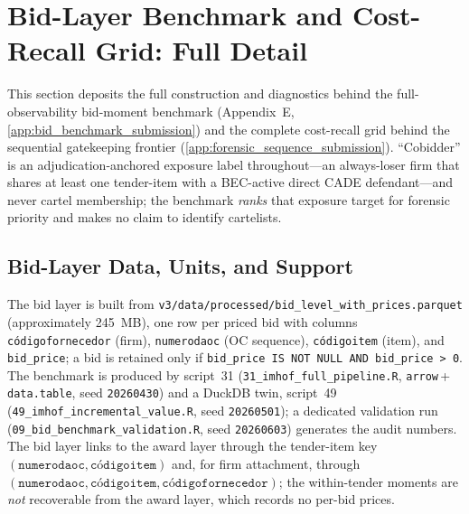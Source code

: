 \section{Bid-Layer Benchmark and Cost-Recall Grid: Full Detail}
\label{supp:bid_cost}

This section deposits the full construction and diagnostics behind the
full-observability bid-moment benchmark (Appendix~E,
\ref{app:bid_benchmark_submission}) and the complete cost-recall grid behind
the sequential gatekeeping frontier (\ref{app:forensic_sequence_submission}).
``Cobidder'' is an adjudication-anchored exposure label throughout---an
always-loser firm that shares at least one tender-item with a BEC-active
direct CADE defendant---and never cartel membership; the benchmark
\emph{ranks} that exposure target for forensic priority and makes no claim to
identify cartelists.

\subsection{Bid-Layer Data, Units, and Support}
\label{supp:bid_data}

The bid layer is built from
\texttt{v3/data/processed/bid\_level\_with\_prices.parquet}
(approximately 245~MB), one row per priced bid with columns
\texttt{c\'odigofornecedor} (firm), \texttt{numerodaoc} (OC sequence),
\texttt{c\'odigoitem} (item), and \texttt{bid\_price}; a bid is retained
only if \texttt{bid\_price IS NOT NULL AND bid\_price > 0}. The benchmark
is produced by script~31 (\texttt{31\_imhof\_full\_pipeline.R},
\texttt{arrow}\,+\,\texttt{data.table}, seed \texttt{20260430}) and a
DuckDB twin, script~49 (\texttt{49\_imhof\_incremental\_value.R}, seed
\texttt{20260501}); a dedicated validation run
(\texttt{09\_bid\_benchmark\_validation.R}, seed \texttt{20260603})
generates the audit numbers. The bid layer links to the award layer
through the tender-item key $(\texttt{numerodaoc},\texttt{c\'odigoitem})$
and, for firm attachment, through
$(\texttt{numerodaoc},\texttt{c\'odigoitem},\texttt{c\'odigofornecedor})$;
the within-tender moments are \emph{not} recoverable from the award layer,
which records no per-bid prices.

